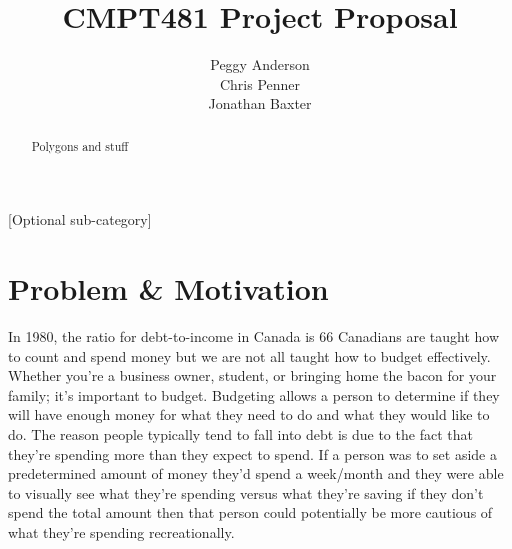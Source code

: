 \documentclass{chi2011}
\begin{document}
\setlength{\paperheight}{11in}
\setlength{\paperwidth}{8.5in}
\setlength{\pdfpageheight}{\paperheight}
\setlength{\pdfpagewidth}{\paperwidth}


\title{CMPT481 Project Proposal}
\author{
\alignauthor Peggy Anderson\\
    \alignauthor Chris Penner\\
    \alignauthor Jonathan Baxter\\
}


\maketitle

\begin{abstract}
    Polygons and stuff
\end{abstract}

[Optional sub-category]


\section{Problem & Motivation}

In 1980, the ratio for debt-to-income in Canada is 66%
Canadians are taught how to count and spend money but we are not all taught how to budget effectively. Whether you're 
a business owner, student, or bringing home the bacon for your family; it's important to budget. Budgeting allows a 
person to determine if they will have enough money for what they need to do and what they would like to do. The reason
people typically tend to fall into debt is due to the fact that they're spending more than they expect to spend. If a 
person was to set aside a predetermined amount of money they'd spend a week/month and they were able to visually see what 
they're spending versus what they're saving if they don't spend the total amount then that person could potentially 
be more cautious of what they're spending recreationally.
\end{document}
